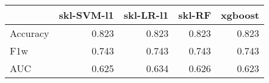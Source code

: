 \begin{tabular}{lrrrr}
\toprule
{} &  skl-SVM-l1 &  skl-LR-l1 &  skl-RF &  xgboost \\
\midrule
Accuracy &       0.823 &      0.823 &   0.823 &    0.823 \\
F1w      &       0.743 &      0.743 &   0.743 &    0.743 \\
AUC      &       0.625 &      0.634 &   0.626 &    0.623 \\
\bottomrule
\end{tabular}
